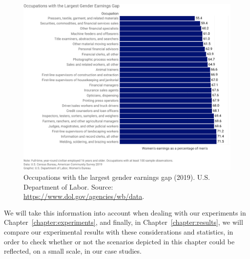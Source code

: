 \begin{figure}[t!]
\includegraphics[scale=.7]{figures/dol_occupations_with_largest_gender_earnings_gap.pdf}
\centering
\caption{Occupations with the largest gender earnings gap (2019).\newline
U.S. Department of Labor. Source: \upshape\protect\url{https://www.dol.gov/agencies/wb/data}.}
\label{fig:dol_occupations_with_largest_gender_earnings_gap}
\end{figure}

We will take this information into account when dealing with our experiments in Chapter~\ref{chapter:experiments}, and finally, in Chapter~\ref{chapter:results}, we will compare our experimental results with these considerations and statistics, in order to check whether or not the scenarios depicted in this chapter could be reflected, on a small scale, in our case studies.
